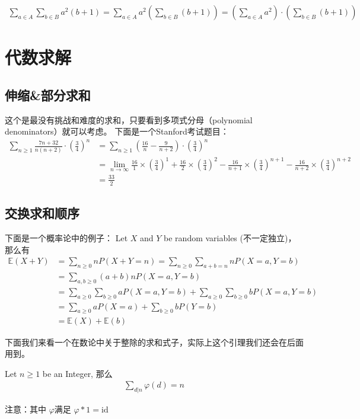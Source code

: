 \documentclass[12pt]{article}
\begin{document}
\begin{align*}
    \sum_{a\in A}^{}{\sum_{b\in B}^{}{a^2(b+1)}}
 =  \sum_{a\in A}^{}{a^2\left(\sum_{b\in B}^{}{(b+1)}\right)}
 =  \left(\sum_{a\in A}^{}{a^2}\right)\cdot \left(\sum_{b\in B}^{}{(b+1)}\right)
\end{align*}

\section{代数求解}
\subsection{伸缩\&部分\;求和}
这个是最没有挑战和难度的求和，只要看到多项式分母（polynomial denominators）就可以考虑。
下面是一个Stanford考试题目：
\begin{align*}
    \sum_{n\ge 1}^{}{\frac{7n+32}{n(n+2)}\cdot \left(\frac34\right)^n}
   & = \sum_{n\ge 1}^{}{\left(\frac{16}{n}-\frac{9}{n+2}\right)\cdot\left(\frac34\right)^n} \\
   & = \lim_{n\to \infty}{\frac{16}{1}\times \left(\frac34\right)^1 + \frac{16}{2}\times \left(\frac34\right)^2
      - \frac{16}{n+1}\times \left(\frac34\right)^{n+1} - \frac{16}{n+2}\times \left(\frac34\right)^{n+2}} \\
   & = \frac{33}{2}
\end{align*}

\subsection{交换求和顺序}
下面是一个概率论中的例子：
Let $X$ and $Y$ be random variables (不一定独立)， 那么有
\begin{align*}
    \mathbb{E}(X+Y) 
    & = \sum_{n\ge 0}^{}{nP(X+Y=n)} 
        = \sum_{n\ge 0}^{}{\sum_{a+b=n}^{}{nP(X=a,Y=b)}}\\
    & = \sum_{a, b\ge 0}^{}{{(a+b)nP(X=a,Y=b)}}   \\
    &= \sum_{a\ge 0}^{}{\sum_{b\ge 0}^{}{aP(X=a,Y=b)}}
        + \sum_{a\ge 0}^{}{\sum_{b\ge 0}^{}{bP(X=a,Y=b)}}\\
    & = \sum_{a\ge 0}^{}{aP(X=a)} + \sum_{b\ge 0}^{}{bP(Y=b)}\\
    & = \mathbb{E}(X) + \mathbb{E}(b)
\end{align*} 

下面我们来看一个在数论中关于整除的求和式子，实际上这个引理我们还会在后面用到。
\begin{framed}
    Let $n\ge 1$ be an Integer, 那么
    \begin{align}
        \sum_{d\big|n}^{}{\varphi(d)}   = n
    \end{align}

    注意：其中  $\varphi$满足 $\varphi * 1 = \mathrm{id}$
\end{framed}
\end{document}

